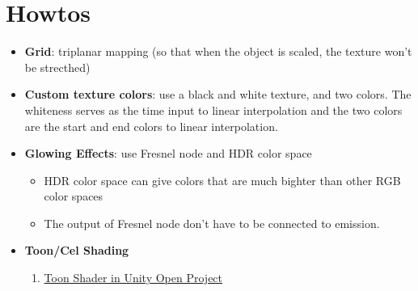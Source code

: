 \chapter{Howtos}

\begin{itemize}
  \item \textbf{Grid}: triplanar mapping (so that when the object is scaled,
  the texture won't be strecthed)
  \item \textbf{Custom texture colors}: use a black and white texture, and two
  colors. The whiteness serves as the time input to linear interpolation and
  the two colors are the start and end colors to linear interpolation.\
  \item \textbf{Glowing Effects}: use Fresnel node and HDR color space
  \begin{itemize}
    \item HDR color space can give colors that are much bighter than other RGB
    color spaces
    \item The output of Fresnel node don't have to be connected to emission.
  \end{itemize}

  \item \textbf{Toon/Cel Shading}
  \begin{enumerate}
    \item \href{https://www.youtube.com/watch?v=GGTTHOpUQDE}{Toon Shader in Unity Open Project}
  \end{enumerate}
\end{itemize}
